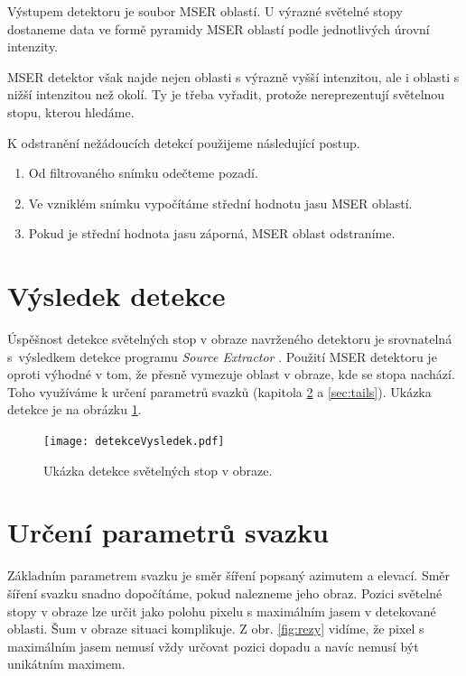 Výstupem detektoru je soubor MSER oblastí. U výrazné světelné stopy dostaneme data ve formě pyramidy MSER oblastí podle jednotlivých úrovní intenzity. 

MSER detektor však najde nejen oblasti s výrazně vyšší intenzitou, ale i oblasti s nižší intenzitou než okolí. Ty je třeba vyřadit, protože nereprezentují světelnou stopu, kterou hledáme. 

K odstranění nežádoucích detekcí použijeme následující postup. 

\begin{enumerate}
\item Od filtrovaného snímku odečteme pozadí.

\item Ve vzniklém snímku vypočítáme střední hodnotu jasu MSER oblastí. 

\item Pokud je střední hodnota jasu záporná, MSER oblast odstraníme.  
\end{enumerate}

\section{Výsledek detekce}
Úspěšnost detekce světelných stop v obraze navrženého detektoru je srovnatelná s~vý\-sled\-kem detekce programu \textit{Source Extractor} \cite{SEXarticle}. Použití MSER detektoru je oproti \cite{SEXarticle} výhodné v tom, že přesně vymezuje oblast v obraze, kde se stopa nachází. Toho využíváme k určení parametrů svazků (kapitola \ref{sec:beam parameters} a \ref{sec:tails}). Ukázka detekce je na obrázku \ref{fig: podstavec}.

\begin{figure}[h!]
\centering
\texttt{[image: detekceVysledek.pdf]}
\caption[Ukázka detekce světelných stop v obraze.]{Ukázka detekce světelných stop v obraze. }
\label{fig: podstavec}
\end{figure}

 	      

\section{Určení parametrů svazku}
\label{sec:beam parameters}
Základním parametrem svazku je směr šíření popsaný azimutem a elevací. Směr šíření svazku snadno dopočítáme, pokud nalezneme jeho obraz. Pozici světelné stopy v obraze lze určit jako polohu pixelu s maximálním jasem v detekované oblasti. Šum v obraze situaci komplikuje. Z obr. \ref{fig:rezy} vidíme, že pixel s maximálním jasem nemusí vždy určovat pozici dopadu a navíc nemusí být unikátním maximem.

